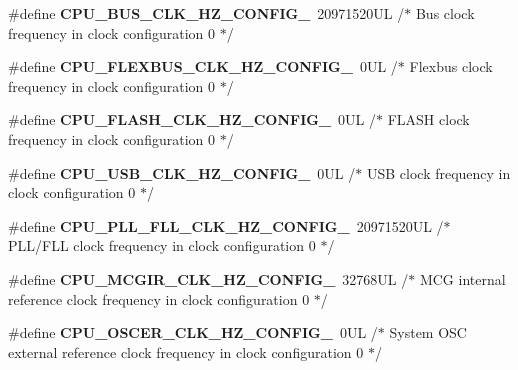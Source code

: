 \begin{DoxyCompactItemize}
\item 
\mbox{\label{group___c_p_u__module_gaf060a047649b9537eb77354ab7917a8b}} 
\#define {\bfseries C\+P\+U\+\_\+\+B\+U\+S\+\_\+\+C\+L\+K\+\_\+\+H\+Z\+\_\+\+C\+O\+N\+F\+I\+G\+\_}~20971520\+U\+L /$\ast$ Bus clock frequency in clock configuration 0 $\ast$/
\item 
\mbox{\label{group___c_p_u__module_ga706c0d4dd14c93181b7a99badddc9a51}} 
\#define {\bfseries C\+P\+U\+\_\+\+F\+L\+E\+X\+B\+U\+S\+\_\+\+C\+L\+K\+\_\+\+H\+Z\+\_\+\+C\+O\+N\+F\+I\+G\+\_}~0\+U\+L /$\ast$ Flexbus clock frequency in clock configuration 0 $\ast$/
\item 
\mbox{\label{group___c_p_u__module_ga09c9820f38d931a0400b832d2582c6f7}} 
\#define {\bfseries C\+P\+U\+\_\+\+F\+L\+A\+S\+H\+\_\+\+C\+L\+K\+\_\+\+H\+Z\+\_\+\+C\+O\+N\+F\+I\+G\+\_}~0\+U\+L /$\ast$ F\+L\+A\+S\+H clock frequency in clock configuration 0 $\ast$/
\item 
\mbox{\label{group___c_p_u__module_ga7bf843fdf59af5fcaf48bea898884a3e}} 
\#define {\bfseries C\+P\+U\+\_\+\+U\+S\+B\+\_\+\+C\+L\+K\+\_\+\+H\+Z\+\_\+\+C\+O\+N\+F\+I\+G\+\_}~0\+U\+L /$\ast$ U\+S\+B clock frequency in clock configuration 0 $\ast$/
\item 
\mbox{\label{group___c_p_u__module_gad2aaa2918b640ae3833fc84e8f983c3c}} 
\#define {\bfseries C\+P\+U\+\_\+\+P\+L\+L\+\_\+\+F\+L\+L\+\_\+\+C\+L\+K\+\_\+\+H\+Z\+\_\+\+C\+O\+N\+F\+I\+G\+\_}~20971520\+U\+L /$\ast$ P\+L\+L/\+F\+L\+L clock frequency in clock configuration 0 $\ast$/
\item 
\mbox{\label{group___c_p_u__module_ga860e7441eac7d5e35385bcd62b019d9d}} 
\#define {\bfseries C\+P\+U\+\_\+\+M\+C\+G\+I\+R\+\_\+\+C\+L\+K\+\_\+\+H\+Z\+\_\+\+C\+O\+N\+F\+I\+G\+\_}~32768\+U\+L /$\ast$ M\+C\+G internal reference clock frequency in clock configuration 0 $\ast$/
\item 
\mbox{\label{group___c_p_u__module_ga2960ebfe6475f475999ea8f1d5448483}} 
\#define {\bfseries C\+P\+U\+\_\+\+O\+S\+C\+E\+R\+\_\+\+C\+L\+K\+\_\+\+H\+Z\+\_\+\+C\+O\+N\+F\+I\+G\+\_}~0\+U\+L /$\ast$ System O\+S\+C external reference clock frequency in clock configuration 0 $\ast$/

\end{DoxyCompactItemize}
